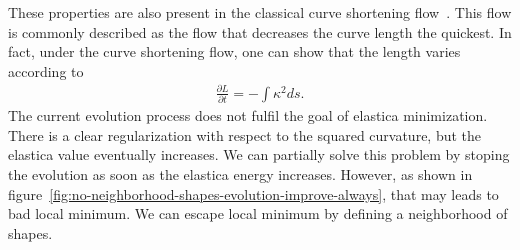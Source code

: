 \documentclass[smallextended]{svjour3}
\begin{document}
These properties are also present in the classical curve shortening flow~\cite{grayson1987heat,ecker2008heat}. This flow is commonly described as the flow that decreases the curve length the quickest. In fact, under the curve shortening flow, one can show that the length varies according to
%
\begin{align*}
\frac{\partial L}{\partial t} = - \int{\kappa ^2 ds}.
\end{align*}
%
The current evolution process does not fulfil the goal of elastica minimization. There is a clear regularization with respect to the squared curvature, but the elastica value eventually increases. We can partially solve this problem by stoping the evolution as soon as the elastica energy increases. However, as shown in figure~\ref{fig:no-neighborhood-shapes-evolution-improve-always}, that may leads to bad local minimum. We can escape local minimum by defining a neighborhood of shapes.
\end{document}

